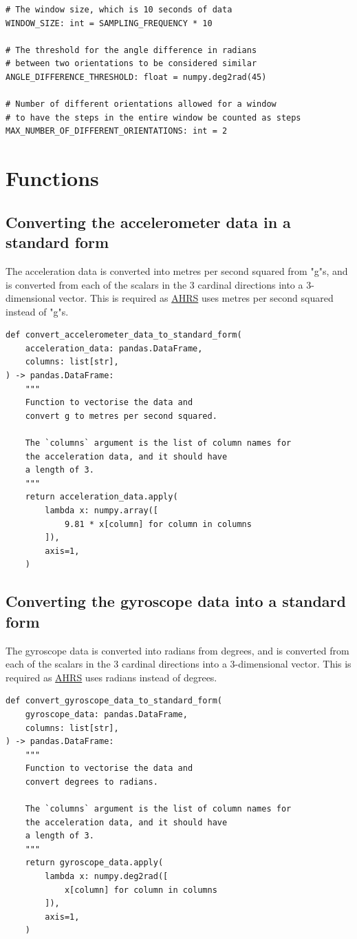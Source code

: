 \documentclass[12pt]{report}
\begin{document}
\clearpage

\begin{verbatim}
# The window size, which is 10 seconds of data
WINDOW_SIZE: int = SAMPLING_FREQUENCY * 10

# The threshold for the angle difference in radians
# between two orientations to be considered similar
ANGLE_DIFFERENCE_THRESHOLD: float = numpy.deg2rad(45)

# Number of different orientations allowed for a window
# to have the steps in the entire window be counted as steps
MAX_NUMBER_OF_DIFFERENT_ORIENTATIONS: int = 2
\end{verbatim}
\section{Functions}
\label{sec:org375ea4a}

\subsection{Converting the accelerometer data in a standard form}
\label{sec:orgcd98342}
The acceleration data is converted into metres per second squared
from "g"s,
and is converted from each of the scalars in the 3 cardinal
directions into a 3-dimensional vector.
This is required as \href{https://ahrs.readthedocs.io/en/latest/}{AHRS} uses metres per second squared instead
of "g"s.
\begin{verbatim}
def convert_accelerometer_data_to_standard_form(
    acceleration_data: pandas.DataFrame,
    columns: list[str],
) -> pandas.DataFrame:
    """
    Function to vectorise the data and
    convert g to metres per second squared.

    The `columns` argument is the list of column names for
    the acceleration data, and it should have
    a length of 3.
    """
    return acceleration_data.apply(
        lambda x: numpy.array([
            9.81 * x[column] for column in columns
        ]),
        axis=1,
    )
\end{verbatim}
\subsection{Converting the gyroscope data into a standard form}
\label{sec:org6f49bbb}
The gyroscope data is converted into radians from degrees,
and is converted from each of the scalars in the 3 cardinal
directions into a 3-dimensional vector.
This is required as \href{https://ahrs.readthedocs.io/en/latest/}{AHRS} uses radians instead of degrees.
\begin{verbatim}
def convert_gyroscope_data_to_standard_form(
    gyroscope_data: pandas.DataFrame,
    columns: list[str],
) -> pandas.DataFrame:
    """
    Function to vectorise the data and
    convert degrees to radians.

    The `columns` argument is the list of column names for
    the acceleration data, and it should have
    a length of 3.
    """
    return gyroscope_data.apply(
        lambda x: numpy.deg2rad([
            x[column] for column in columns
        ]),
        axis=1,
    )
\end{verbatim}
\end{document}
